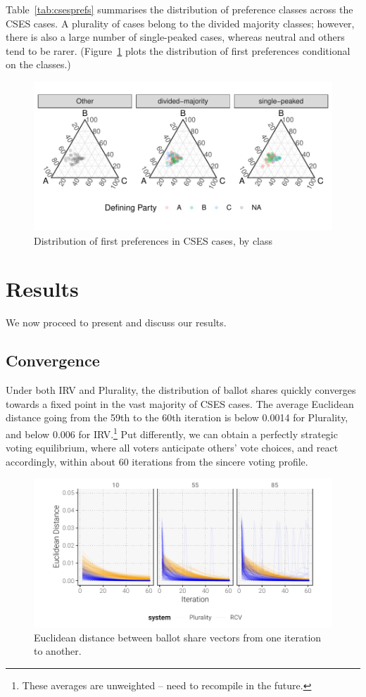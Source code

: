 \documentclass[12pt, letter]{article}
\begin{document}
Table~\ref{tab:csesprefs} summarises the distribution of preference classes across the CSES cases. A plurality of cases belong to the divided majority classes; however, there is also a large number of single-peaked cases, whereas neutral and others tend to be rarer. (Figure~\ref{fig:cses_fp} plots the distribution of first preferences conditional on the classes.)

\begin{figure}[!htb]
	\centering
	\includegraphics[width = 0.6 \textwidth]{../output/figures/cses_fp.pdf}
	\caption{Distribution of first preferences in CSES cases, by class}
	\label{fig:cses_fp}
\end{figure}

\section{Results}

We now proceed to present and discuss our results.

\subsection{Convergence}

Under both IRV and Plurality, the distribution of ballot shares quickly converges towards a fixed point in the vast majority of CSES cases. The average Euclidean distance going from the 59th to the 60th iteration is below 0.0014 for Plurality, and below 0.006 for IRV.\footnote{These averages are unweighted -- need to recompile in the future.} Put differently, we can obtain a perfectly strategic voting equilibrium, where all voters anticipate others' vote choices, and react accordingly, within about 60 iterations from the sincere voting profile.

\begin{figure}[!tbh]
	\centering
	\includegraphics[width = \textwidth]{../output/figures/euclidean}
	\caption{Euclidean distance between ballot share vectors from one iteration to another.}
	\label{fig:convergence}
\end{figure}
\end{document}
